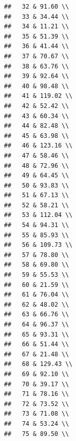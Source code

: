 \documentclass{article}\usepackage[]{graphicx}\usepackage[]{color}
\makeatletter
\newenvironment{kframe}{%
 \def\at@end@of@kframe{}%
 \ifinner\ifhmode%
  \def\at@end@of@kframe{\end{minipage}}%
  \begin{minipage}{\columnwidth}%
 \fi\fi%
 \def\FrameCommand##1{\hskip\@totalleftmargin \hskip-\fboxsep
 \colorbox{shadecolor}{##1}\hskip-\fboxsep
     \hskip-\linewidth \hskip-\@totalleftmargin \hskip\columnwidth}%
 \MakeFramed {\advance\hsize-\width
   \@totalleftmargin\z@ \linewidth\hsize
   \@setminipage}}%
 {\par\unskip\endMakeFramed%
 \at@end@of@kframe}
\newenvironment{knitrout}{}{} %
\makeatother
\begin{document}
\begin{knitrout}
\begin{kframe}
\begin{verbatim}
##   32 & 91.60 \\ 
##   33 & 34.44 \\ 
##   34 & 11.21 \\ 
##   35 & 51.39 \\ 
##   36 & 41.44 \\ 
##   37 & 70.67 \\ 
##   38 & 63.76 \\ 
##   39 & 92.64 \\ 
##   40 & 98.48 \\ 
##   41 & 119.02 \\ 
##   42 & 52.42 \\ 
##   43 & 60.34 \\ 
##   44 & 82.48 \\ 
##   45 & 63.98 \\ 
##   46 & 123.16 \\ 
##   47 & 58.46 \\ 
##   48 & 72.96 \\ 
##   49 & 64.45 \\ 
##   50 & 93.83 \\ 
##   51 & 67.13 \\ 
##   52 & 58.21 \\ 
##   53 & 112.04 \\ 
##   54 & 94.31 \\ 
##   55 & 85.93 \\ 
##   56 & 109.73 \\ 
##   57 & 78.80 \\ 
##   58 & 69.80 \\ 
##   59 & 55.53 \\ 
##   60 & 21.59 \\ 
##   61 & 76.04 \\ 
##   62 & 48.02 \\ 
##   63 & 66.76 \\ 
##   64 & 96.37 \\ 
##   65 & 93.31 \\ 
##   66 & 51.44 \\ 
##   67 & 21.48 \\ 
##   68 & 129.43 \\ 
##   69 & 92.10 \\ 
##   70 & 39.17 \\ 
##   71 & 78.16 \\ 
##   72 & 73.52 \\ 
##   73 & 71.08 \\ 
##   74 & 53.24 \\ 
##   75 & 89.50 \\ 

\end{verbatim}
\end{kframe}
\end{knitrout}
\end{document}
